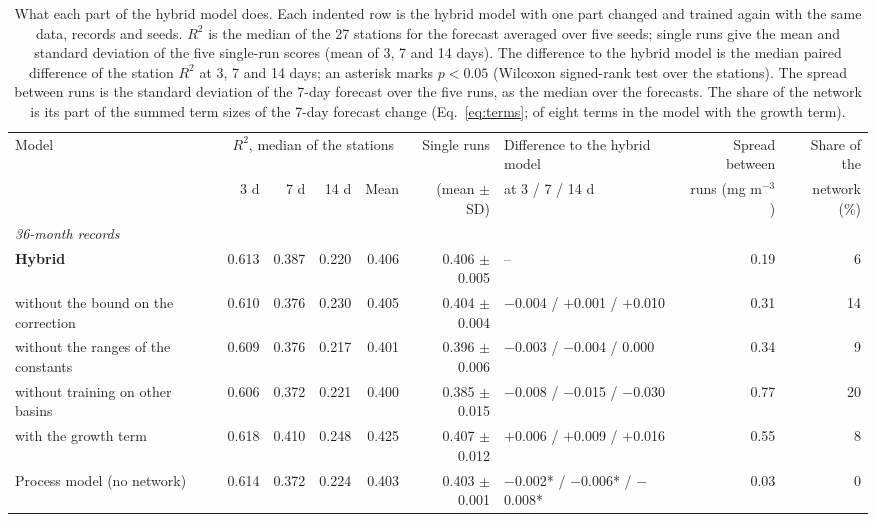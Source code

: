 \begin{table}[tbp]
\centering
\caption{What each part of the hybrid model does. Each indented row is the hybrid model with one part changed and trained again with the same data, records and seeds. $R^2$ is the median of the 27 stations for the forecast averaged over five seeds; single runs give the mean and standard deviation of the five single-run scores (mean of 3, 7 and 14 days). The difference to the hybrid model is the median paired difference of the station $R^2$ at 3, 7 and 14 days; an asterisk marks $p < 0.05$ (Wilcoxon signed-rank test over the stations). The spread between runs is the standard deviation of the 7-day forecast over the five runs, as the median over the forecasts. The share of the network is its part of the summed term sizes of the 7-day forecast change (Eq.~\eqref{eq:terms}; of eight terms in the model with the growth term).}
\label{tab:parts}
\footnotesize
\setlength{\tabcolsep}{3.5pt}
\begin{adjustbox}{max width=\textwidth}
\begin{tabular}{lrrrrrlrr}
\toprule
Model & \multicolumn{4}{c}{$R^2$, median of the stations} & Single runs & Difference to the hybrid model & Spread between & Share of the \\ \cmidrule(lr){2-5}
 & 3 d & 7 d & 14 d & Mean & (mean $\pm$ SD) & at 3 / 7 / 14 d & runs (mg m$^{-3}$) & network (\%) \\
\midrule
\multicolumn{9}{l}{\textit{36-month records}} \\
\textbf{Hybrid} & 0.613 & 0.387 & 0.220 & 0.406 & 0.406 $\pm$ 0.005 & -- & 0.19 & 6 \\
\quad without the bound on the correction & 0.610 & 0.376 & 0.230 & 0.405 & 0.404 $\pm$ 0.004 & $-$0.004 / $+$0.001 / $+$0.010 & 0.31 & 14 \\
\quad without the ranges of the constants & 0.609 & 0.376 & 0.217 & 0.401 & 0.396 $\pm$ 0.006 & $-$0.003 / $-$0.004 / 0.000 & 0.34 & 9 \\
\quad without training on other basins & 0.606 & 0.372 & 0.221 & 0.400 & 0.385 $\pm$ 0.015 & $-$0.008 / $-$0.015 / $-$0.030 & 0.77 & 20 \\
\quad with the growth term & 0.618 & 0.410 & 0.248 & 0.425 & 0.407 $\pm$ 0.012 & $+$0.006 / $+$0.009 / $+$0.016 & 0.55 & 8 \\
\midrule
Process model (no network) & 0.614 & 0.372 & 0.224 & 0.403 & 0.403 $\pm$ 0.001 & $-$0.002* / $-$0.006* / $-$0.008* & 0.03 & 0 \\

\end{tabular}
\end{adjustbox}
\end{table}
